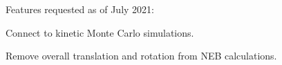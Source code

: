 Features requested as of July 2021\+:


\begin{DoxyItemize}
\item Connect to kinetic Monte Carlo simulations.
\item Remove overall translation and rotation from N\+EB calculations. 
\end{DoxyItemize}